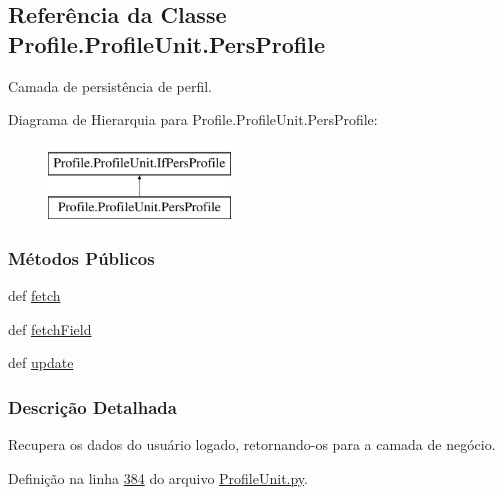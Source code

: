\hypertarget{classProfile_1_1ProfileUnit_1_1PersProfile}{\subsection{Referência da Classe Profile.\-Profile\-Unit.\-Pers\-Profile}
\label{classProfile_1_1ProfileUnit_1_1PersProfile}
}


Camada de persistência de perfil.  


Diagrama de Hierarquia para Profile.\-Profile\-Unit.\-Pers\-Profile\-:\begin{figure}[H]
\begin{center}
\leavevmode
\includegraphics[height=2.000000cm]{d7/dec/classProfile_1_1ProfileUnit_1_1PersProfile}
\end{center}
\end{figure}
\subsubsection*{Métodos Públicos}
\begin{DoxyCompactItemize}
\item 
def \hyperlink{classProfile_1_1ProfileUnit_1_1PersProfile_aca301abc09bc12a7cf0a61437f941a8a}{fetch}
\item 
def \hyperlink{classProfile_1_1ProfileUnit_1_1PersProfile_a68ab67bed74c46b72216e256af8f6711}{fetch\-Field}
\item 
def \hyperlink{classProfile_1_1ProfileUnit_1_1PersProfile_af1e4b3cf0eee0a14b5113210503ff665}{update}
\end{DoxyCompactItemize}


\subsubsection{Descrição Detalhada}
Recupera os dados do usuário logado, retornando-\/os para a camada de negócio. 

Definição na linha \hyperlink{ProfileUnit_8py_source_l00384}{384} do arquivo \hyperlink{ProfileUnit_8py_source}{Profile\-Unit.\-py}.



